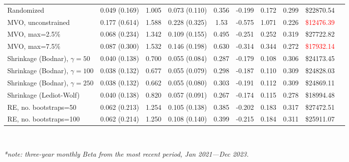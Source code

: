 \documentclass[12pt,letterpaper]{article}
\begin{document}
\begin{landscape}
\begin{table}[ht]
{\begin{tabular}{lccccccccc}
Randomized 
& 0.049 (0.169) 
& 1.005
& 0.073 (0.110) 
& 0.356 
& -0.199
& 0.172 
& 0.299 
& \textcolor{mygreen}{\$22870.54} \\

MVO, unconstrained 
& 0.177 (0.614)
& 1.588
& 0.228 (0.325) 
& 1.53  
& -0.575 
& 1.071 
& 0.226 
& \textcolor{red}{\$12476.39} \\

MVO, max=2.5\%
& 0.068 (0.234)
& 1.342
& 0.109 (0.155) 
& 0.495 
& -0.251 
& 0.252 
& 0.319 
& \textcolor{mygreen}{\$27722.82} \\

MVO, max=7.5\% 
& 0.087 (0.300)
& 1.532
& 0.146 (0.198) 
& 0.630 
& -0.314 
& 0.344 
& 0.272 
& \textcolor{red}{\$17932.14} \\


Shrinkage (Bodnar), $\gamma=50$
& 0.040 (0.138)
& 0.700
& 0.055 (0.084) 
& 0.287 
& -0.179 
& 0.108 
& 0.306 
& \textcolor{mygreen}{\$24173.45} \\


Shrinkage (Bodnar), $\gamma=100$
& 0.038 (0.132)
& 0.677
& 0.055 (0.079) 
& 0.298 
& -0.187 
& 0.110 
& 0.309 
& \textcolor{mygreen}{\$24828.03} \\

Shrinkage (Bodnar), $\gamma=250$
& 0.038 (0.132)
& 0.662
& 0.055 (0.080) 
& 0.303 
& -0.191 
& 0.112 
& 0.309 
& \textcolor{mygreen}{\$24869.11} \\

Shrinkage (Lediot-Wolf)
& 0.040 (0.138)
& 0.820
& 0.057 (0.091) 
& 0.267 
& -0.174
& 0.115 
& 0.278
& \textcolor{mygreen}{\$18994.48} \\

RE, no. bootstraps=50
& 0.062 (0.213)
& 1.254
& 0.105 (0.138) 
& 0.385
& -0.202 
& 0.183 
& 0.317 
& \textcolor{mygreen}{\$27472.51} \\

RE, no. bootstraps=100
& 0.062 (0.214)
& 1.250
& 0.108 (0.140) 
& 0.399  
& -0.215 
& 0.184 
& 0.311
& \textcolor{mygreen}{\$25911.07} \\

\bottomrule
\end{tabular}
}
\\{\textit{*note: three-year monthly Beta from the most recent period, Jan 2021---Dec 2023.}\par}
\end{table}
\end{landscape}
\restoregeometry
\end{document}
